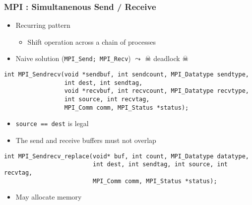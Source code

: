 \documentclass[xcolor={x11names,svgnames,psnames}]{beamer}
\begin{document}
\begin{frame}[fragile]
\frametitle{MPI : Simultanenous Send / Receive}

\begin{itemize}
\item Recurring pattern
  \begin{itemize}
  \item Shift operation across a chain of processes
  \end{itemize}
\item Naive solution (\texttt{MPI_Send; MPI_Recv}) $\leadsto$ \alert{$\skull$ deadlock $\skull$}
\end{itemize}

\medskip

\begin{verbatim}
int MPI_Sendrecv(void *sendbuf, int sendcount, MPI_Datatype sendtype,
                 int dest, int sendtag,
                 void *recvbuf, int recvcount, MPI_Datatype recvtype,
                 int source, int recvtag,
                 MPI_Comm comm, MPI_Status *status);
\end{verbatim}

\begin{itemize}
\item \texttt{source == dest} is legal
\item The send and receive buffers must not overlap
\end{itemize}

\medskip

\begin{verbatim}
int MPI_Sendrecv_replace(void* buf, int count, MPI_Datatype datatype,
                         int dest, int sendtag, int source, int recvtag,
                         MPI_Comm comm, MPI_Status *status);
\end{verbatim}

\begin{itemize}
\item May allocate memory
\end{itemize}
\end{frame}

\end{document}
